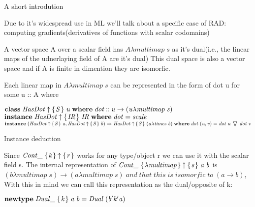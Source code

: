 \documentclass{beamer}
\newcommand{\Conid}[1]{\mathit{#1}}
\newcommand{\Varid}[1]{\mathit{#1}}
\begin{document}
\begin{frame}{A short introdution}

Due to it's widespread use in ML we'll talk about a specific case of RAD: computing gradients(derivatives of functions with scalar codomains)

A vector space A over a scalar field has \ensuremath{\Conid{A}\lambda \Varid{multimap}\;\Varid{s}} as it's dual(i.e., the linear maps of the udnerlaying field of A are it's dual)
This dual space is also a vector space and if A is finite in dimention they are isomorfic.

Each linear map in \ensuremath{\Conid{A}\lambda \Varid{multimap}\;\Varid{s}} can be represented in the form of dot u for some u :: A where

\ensuremath{\mathbf{class}\;\Conid{HasDot}\mathbin{\uparrow}\{\mskip1.5mu \Conid{S}\mskip1.5mu\}\;\Varid{u}\;\mathbf{where}\;\Varid{dot}\mathbin{::}\Varid{u}\rightarrow (\Varid{u}\lambda \Varid{multimap}\;\Varid{s})}
\ensuremath{\mathbf{instance}\;\Conid{HasDot}\mathbin{\uparrow}\{\mskip1.5mu \Conid{IR}\mskip1.5mu\}\;\Conid{IR}\;\mathbf{where}\;\Varid{dot}\mathrel{=}\Varid{scale}}
\ensuremath{\mathbf{instance}\;(\Conid{HasDot}\mathbin{\uparrow}\{\mskip1.5mu \Conid{S}\mskip1.5mu\}\;\Varid{a},\Conid{HasDot}\mathbin{\uparrow}\{\mskip1.5mu \Conid{S}\mskip1.5mu\}\;\Varid{b})\Rightarrow\Conid{HasDot}\mathbin{\uparrow}\{\mskip1.5mu \Conid{S}\mskip1.5mu\}\;(\Varid{a}\lambda \Varid{times}\;\Varid{b})\;\mathbf{where}\;\Varid{dot}\;(\Varid{u},\Varid{v})\mathrel{=}\Varid{dot}\;\Varid{u}\; \bigtriangledown \;\Varid{dot}\;\Varid{v}}


\end{frame}



\begin{frame}{Instance deduction}

Since \ensuremath{\Conid{Cont\char95 }\;\{\mskip1.5mu \Varid{k}\mskip1.5mu\}\mathbin{\uparrow}\{\mskip1.5mu \Varid{r}\mskip1.5mu\}} works for any type/object r we can use it with the scalar field s.
The internal representation of \ensuremath{\Conid{Cont\char95 }\;\{\mskip1.5mu \lambda \Varid{multimap}\mskip1.5mu\}\mathbin{\uparrow}\{\mskip1.5mu \Varid{s}\mskip1.5mu\}\;\Varid{a}\;\Varid{b}} is \ensuremath{(\Varid{b}\lambda \Varid{multimap}\;\Varid{s})\rightarrow (\Varid{a}\lambda \Varid{multimap}\;\Varid{s})\;\Varid{and}\;\Varid{that}\;\Varid{this}\;\Varid{is}\;\Varid{isomorfic}\;\Varid{to}\;(\Varid{a}\rightarrow \Varid{b})},
With this in mind we can call this representation as the dual/opposite of k:

\ensuremath{\mathbf{newtype}\;\Conid{Dual\char95 }\;\{\mskip1.5mu \Varid{k}\mskip1.5mu\}\;\Varid{a}\;\Varid{b}\mathrel{=}\Conid{Dual}\;(\Varid{b'k'a})}

\end{frame}
\end{document}
